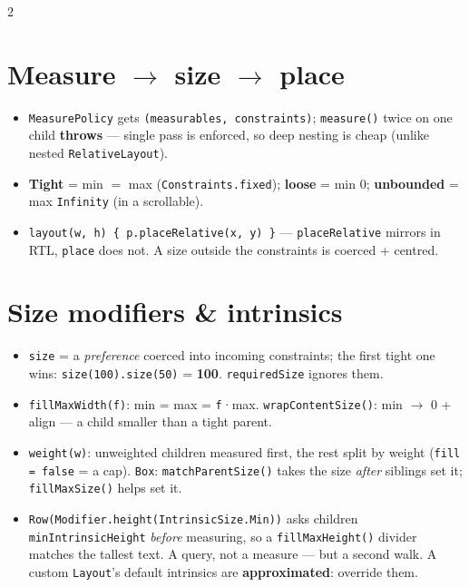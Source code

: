 \documentclass[8pt]{extarticle}
\begin{document}
\begin{multicols}{2}
\raggedright

\section{Measure $\to$ size $\to$ place}
\begin{itemize}\raggedright
  \item \texttt{MeasurePolicy} gets \texttt{(measurables, constraints)}; \texttt{measure()} twice
        on one child \textbf{throws} — single pass is enforced, so deep nesting is cheap
        (unlike nested \texttt{RelativeLayout}).
  \item \textbf{Tight} = min $=$ max (\texttt{Constraints.fixed}); \textbf{loose} = min 0;
        \textbf{unbounded} = max \texttt{Infinity} (in a scrollable).
  \item \texttt{layout(w, h) \{ p.placeRelative(x, y) \}} — \texttt{placeRelative} mirrors in
        RTL, \texttt{place} does not. A size outside the constraints is coerced + centred.
\end{itemize}

\section{Size modifiers \& intrinsics}
\begin{itemize}\raggedright
  \item \texttt{size} = a \emph{preference} coerced into incoming constraints; the first tight
        one wins: \texttt{size(100).size(50)} = \textbf{100}. \texttt{requiredSize} ignores them.
  \item \texttt{fillMaxWidth(f)}: min = max = \texttt{f}·max. \texttt{wrapContentSize()}: min
        $\to$ 0 + align — a child smaller than a tight parent.
  \item \texttt{weight(w)}: unweighted children measured first, the rest split by weight
        (\texttt{fill = false} = a cap). \texttt{Box}: \texttt{matchParentSize()} takes the size
        \emph{after} siblings set it; \texttt{fillMaxSize()} helps set it.
  \item \texttt{Row(Modifier.height(IntrinsicSize.Min))} asks children
        \texttt{minIntrinsicHeight} \emph{before} measuring, so a \texttt{fillMaxHeight()}
        divider matches the tallest text. A query, not a measure — but a second walk. A custom
        \texttt{Layout}'s default intrinsics are \textbf{approximated}: override them.
\end{itemize}


\end{multicols}
\end{document}
